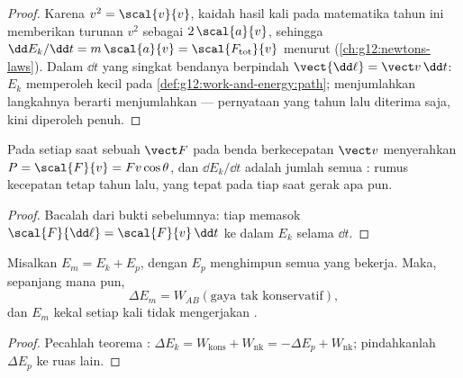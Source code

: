 \begin{proof}
Karena $v^2 = \scal{v}{v}$, kaidah hasil kali pada matematika tahun ini
memberikan turunan $v^2$ sebagai $2\,\scal{a}{v}$, sehingga
$\dd E_k/\dd t = m\,\scal{a}{v} = \scal{F_{\text{tot}}}{v}$ menurut
 (\cref{ch:g12:newtons-laws}). Dalam $\dd t$ yang singkat
bendanya berpindah $\vect{\dd\ell} = \vect v\,\dd t$: $E_k$ memperoleh
 kecil pada \cref{def:g12:work-and-energy:path}; menjumlahkan langkahnya
berarti menjumlahkan  --- pernyataan yang tahun lalu diterima saja, kini diperoleh penuh.
\end{proof}

\begin{proposition}\label{prop:g12:work-and-energy:power}
Pada setiap saat sebuah  $\vect F$ pada benda berkecepatan $\vect v$
menyerahkan  $P = \scal{F}{v} = Fv\cos\theta$, dan
$\dd E_k/\dd t$ adalah jumlah  semua : rumus kecepatan tetap
tahun lalu, yang tepat pada tiap saat gerak apa pun.
\end{proposition}

\begin{proof}
Bacalah dari bukti sebelumnya: tiap  memasok
$\scal{F}{\dd\ell} = \scal{F}{v}\,\dd t$ ke dalam $E_k$ selama $\dd t$.
\end{proof}

\begin{theorem}\label{thm:g12:work-and-energy:emtheorem}
Misalkan $E_m = E_k + E_p$, dengan $E_p$ menghimpun 
semua  yang bekerja. Maka, sepanjang  mana pun,
\[
\Delta E_m = W_{AB}(\text{gaya tak konservatif}),
\]
dan $E_m$ kekal setiap kali  tidak mengerjakan .
\end{theorem}

\begin{proof}
Pecahlah teorema : $\Delta E_k = W_{\text{kons}} +
W_{\text{nk}} = -\Delta E_p + W_{\text{nk}}$; pindahkanlah $\Delta E_p$ ke ruas lain.
\end{proof}

